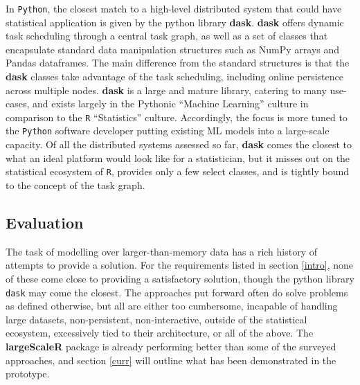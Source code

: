 In \texttt{Python}, the closest match to a high-level distributed system that could have statistical application is given by the python library \textbf{dask}\cite{rocklin2015dask}.
\textbf{dask} offers dynamic task scheduling through a central task graph, as well as a set of classes that encapsulate standard data manipulation structures such as NumPy arrays and Pandas dataframes.
The main difference from the standard structures is that the \textbf{dask} classes take advantage of the task scheduling, including online persistence across multiple nodes.
\textbf{dask} is a large and mature library, catering to many use-cases, and exists largely in the Pythonic ``Machine Learning'' culture in comparison to the \texttt{R} ``Statistics'' culture.
Accordingly, the focus is more tuned to the \texttt{Python} software developer putting existing ML models into a large-scale capacity.
Of all the distributed systems assessed so far, \textbf{dask} comes the closest to what an ideal platform would look like for a statistician, but it misses out on the statistical ecosystem of \texttt{R}, provides only a few select classes, and is tightly bound to the concept of the task graph.

\subsection{Evaluation}

The task of modelling over larger-than-memory data has a rich history of attempts to provide a solution.
For the requirements listed in section \ref{intro}, none of these come close to providing a satisfactory solution, though the python library \texttt{dask} may come the closest.
The approaches put forward often do solve problems as defined otherwise, but all are either too cumbersome, incapable of handling large datasets, non-persistent, non-interactive, outside of the statistical ecosystem, excessively tied to their architecture, or all of the above.
The \textbf{largeScaleR} package is already performing better than some of the surveyed approaches, and section \ref{curr} will outline what has been demonstrated in the prototype.
